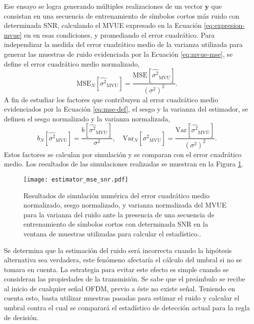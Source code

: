 Ese ensayo se logra generando múltiples realizaciones de un vector $\mathbf{y}$ que consistan en una secuencia de entrenamiento de símbolos cortos más ruido con determinada SNR, calculando el MVUE expresado en la Ecuación \ref{eq:expresion-mvue} en en esas condiciones, y promediando el error cuadrático. \color{RoyalBlue} Para independizar la medida del error cuadrático medio de la varianza utilizada para generar las muestras de ruido evidenciada por la Ecuación \ref{eq:mvue-mse}, se define el error cuadrático medio normalizado,
\begin{equation}
    \text{MSE}_N[\widehat{\sigma^2}_{\text{MVU}}] = \frac{\text{MSE}[\widehat{\sigma^2}_{\text{MVU}}]}{\left(\sigma^2\right)^2}.
\end{equation}
A fin de estudiar los factores que contribuyen al error cuadrático medio evidenciados por la Ecuación \ref{eq:mse-def}, el sesgo y la varianza del estimador, se definen el sesgo normalizado y la varianza normalizada,
\begin{equation}
    b_N[\widehat{\sigma^2}_{\text{MVU}}] = \frac{b[\widehat{\sigma^2}_{\text{MVU}}]}{\sigma^2},
    \quad
    \text{Var}_N[\widehat{\sigma^2}_{\text{MVU}}] = \frac{\text{Var}[\widehat{\sigma^2}_{\text{MVU}}]}{\left(\sigma^2\right)^2}.
\end{equation}
Estos factores se calculan por simulación y se comparan con el error cuadrático medio. Los resultados de las simulaciones realizadas se muestran en la Figura \ref{fig:estimator_mse_snr}.
\begin{figure}[t]
    \centering{}\texttt{[image: estimator\_mse\_snr.pdf]}
    \caption[Degradación del MSE normalizado del MVUE para la varianza del ruido ante presencia de señales en la ventana de evaluación.]{Resultados de simulación numérica del error cuadrático medio normalizado, sesgo normalizado, y varianza normalizada del MVUE para la varianza del ruido ante la presencia de una secuencia de entrenamiento de símbolos cortos con determinada SNR en la ventana de muestras utilizadas para calcular el estadístico..\label{fig:estimator_mse_snr}}
\end{figure}
\color{black}

Se determina que la estimación del ruido será incorrecta cuando la hipótesis alternativa sea verdadera, este fenómeno afectaría el cálculo del umbral si no se tomara en cuenta. La estrategia para evitar este efecto es simple cuando se consideran las propiedades de la transmisión. Se sabe que el preámbulo se recibe al inicio de cualquier señal OFDM, previo a éste no existe señal. Teniendo en cuenta esto, basta utilizar muestras pasadas para estimar el ruido y calcular el umbral contra el cual se comparará el estadístico de detección actual para la regla de decisión.


